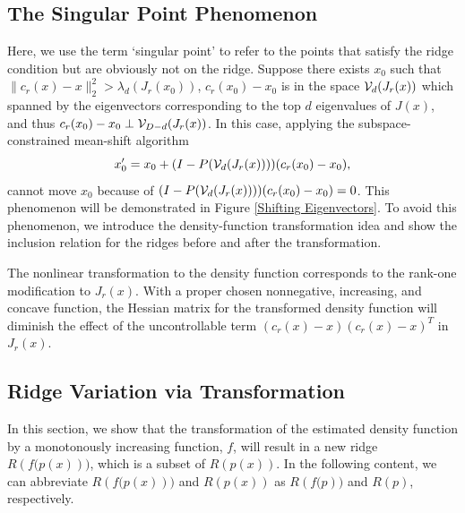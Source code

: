 \documentclass[aos,preprint]{imsart}
\theoremstyle{remark}
\begin{document}
\subsection{The Singular Point Phenomenon}
Here, we use the term `singular point' to refer to the points that satisfy the ridge condition but are obviously not on the ridge.
Suppose there exists $x_0$ such that $\|c_r(x)-x\|_2^2>\lambda_d(J_r(x_0))$, $c_r(x_0)-x_0$ is in the space ${\cal V}_d(J_r(x))$ which spanned by the eigenvectors corresponding to the top $d$ eigenvalues of $J(x)$, and thus $c_r(x_0)-x_0\perp {\cal V}_{D-d}(J_r(x))$. In this case, applying the subspace-constrained mean-shift algorithm 
\[
x_0' = x_0+ (I-P({\cal V}_d(J_r(x)))) (c_r(x_0)-x_0),
\] 
cannot move $x_0$ because of $(I- P({\cal V}_d(J_r(x)))) (c_r(x_0)-x_0)=0$. This phenomenon will be demonstrated in Figure \ref{Shifting Eigenvectors}. To avoid this phenomenon, we introduce the density-function transformation idea and show the inclusion relation for the ridges before and after the transformation.

The nonlinear transformation to the density function corresponds to the rank-one modification to $J_r(x)$. With a proper chosen nonnegative, increasing, and concave function, the Hessian matrix for the transformed density function will diminish the effect of the uncontrollable term $(c_r(x)-x)(c_r(x)-x)^T$ in $J_r(x)$.
\subsection{Ridge Variation via Transformation}
In this section, we show that the transformation of the estimated density function by a monotonously increasing function, $f$, will result in a new ridge $R({f(p}(x)))$, which is a subset of $R({p}(x))$. In the following content, we can abbreviate $R({f(p}(x)))$ and $R({p}(x))$ as $R({f(p}))$ and $R({p})$, respectively.
\end{document}
